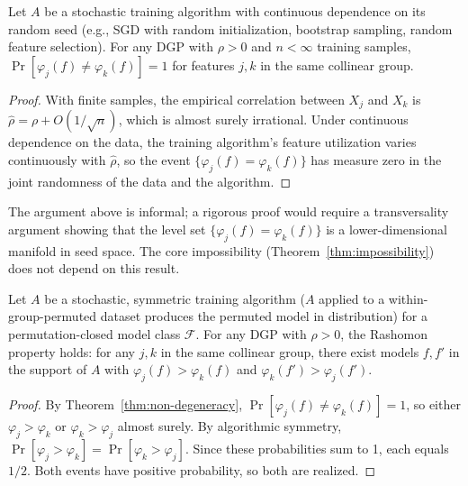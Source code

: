 \documentclass{jmlr}
\begin{document}
\begin{proposition}
\label{thm:non-degeneracy}
Let $A$ be a stochastic training algorithm with continuous dependence on its random seed (e.g., SGD with random initialization, bootstrap sampling, random feature selection). For any DGP with $\rho > 0$ and $n < \infty$ training samples, $\Pr[\varphi_j(f) \neq \varphi_k(f)] = 1$ for features $j, k$ in the same collinear group.
\end{proposition}

\begin{proof}
With finite samples, the empirical correlation between $X_j$ and $X_k$ is $\hat\rho = \rho + O(1/\sqrt{n})$, which is almost surely irrational. Under continuous dependence on the data, the training algorithm's feature utilization varies continuously with $\hat\rho$, so the event $\{\varphi_j(f) = \varphi_k(f)\}$ has measure zero in the joint randomness of the data and the algorithm.
\end{proof}

\begin{remark}
The argument above is informal; a rigorous proof would require a transversality argument showing that the level set $\{\varphi_j(f) = \varphi_k(f)\}$ is a lower-dimensional manifold in seed space. The core impossibility (Theorem~\ref{thm:impossibility}) does not depend on this result.
\end{remark}

\begin{theorem}
\label{thm:rashomon-inevitability}
Let $A$ be a stochastic, symmetric training algorithm ($A$ applied to a within-group-permuted dataset produces the permuted model in distribution) for a permutation-closed model class $\mathcal{F}$. For any DGP with $\rho > 0$, the Rashomon property holds: for any $j, k$ in the same collinear group, there exist models $f, f'$ in the support of $A$ with $\varphi_j(f) > \varphi_k(f)$ and $\varphi_k(f') > \varphi_j(f')$.
\end{theorem}

\begin{proof}
By Theorem~\ref{thm:non-degeneracy}, $\Pr[\varphi_j(f) \neq \varphi_k(f)] = 1$, so either $\varphi_j > \varphi_k$ or $\varphi_k > \varphi_j$ almost surely. By algorithmic symmetry, $\Pr[\varphi_j > \varphi_k] = \Pr[\varphi_k > \varphi_j]$. Since these probabilities sum to 1, each equals $1/2$. Both events have positive probability, so both are realized.
\end{proof}
\end{document}
